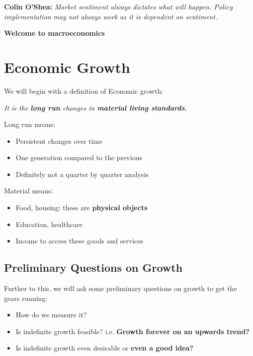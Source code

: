 \documentclass[12pt, letterpaper]{article}
\begin{document}
\begin{center}
	\textbf{Colin O'Shea:} \textit{Market sentiment always dictates what will happen. Policy implementation may not always work as it is dependent on sentiment.}
\end{center}

\begin{center}
	\Large{\textbf{Welcome to macroeconomics}}
\end{center}

\newpage
\section{Economic Growth}
We will begin with a definition of Economic growth:

\textit{It is the \textbf{long run} changes in \textbf{material living standards.} \\}

Long run means:
\begin{itemize}
	\item Persistent changes over time
	\item One generation compared to the previous
	\item Definitely not a quarter by quarter analysis \\
\end{itemize}

Material means:
\begin{itemize}
	\item Food, housing: these are \textbf{physical objects}
	\item Education, healthcare
	\item Income to access these goods and services
\end{itemize}

\subsection{Preliminary Questions on Growth}
Further to this, we will ask some preliminary questions on growth to get the gears running:
\begin{itemize}
	\item How do we measure it?
	\item Is indefinite growth feasible? i.e. \textbf{Growth forever on an upwards trend?}
	\item Is indefinite growth even desirable or \textbf{even a good idea?}
\end{itemize}
\end{document}
